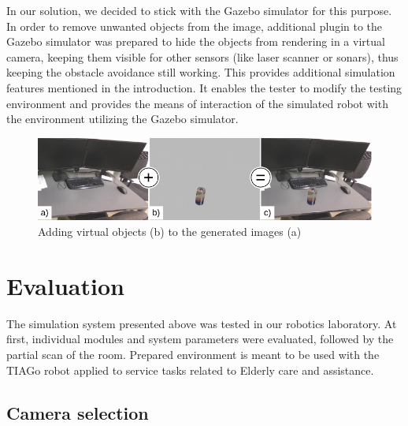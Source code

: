 \documentclass{svproc}
\begin{document}
In our solution, we decided to stick with the Gazebo simulator for this purpose.
In order to remove unwanted objects from the image, additional plugin to the Gazebo simulator
was prepared to hide the objects from rendering in a virtual camera, keeping them 
visible for other sensors (like laser scanner or sonars), thus keeping the obstacle avoidance
still working. This provides additional simulation features mentioned in the introduction. 
It enables the tester to modify the testing environment and provides the means of interaction 
of the simulated robot with the environment utilizing the Gazebo simulator.

\begin{figure}[!ht]
    \centering
        \includegraphics{img/gazebo_integration/img.pdf}
    \caption{Adding virtual objects (b) to the generated images (a)}
    \label{fig:join}
    \vspace{-5mm}
\end{figure}



\section{Evaluation}
\label{sec:evaluation}

The simulation system presented above was tested in our robotics laboratory. At first, individual modules
and system parameters were evaluated, followed by the partial scan of the room. Prepared environment is 
meant to be used with the TIAGo robot applied to service tasks related to Elderly care and assistance.

\subsection{Camera selection}
\end{document}

